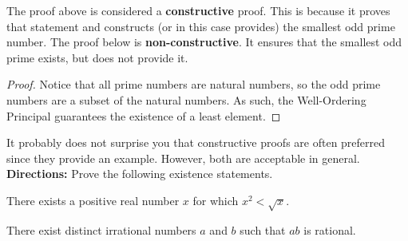 The proof above is considered a \textbf{constructive} proof.  This is because it proves that statement and constructs (or in this case provides) the smallest odd prime number.  The proof below is \textbf{non-constructive}.  It ensures that the smallest odd prime exists, but does not provide it.

\begin{proof}  Notice that all prime numbers are natural numbers, so the odd prime numbers are a subset of the natural numbers.  As such, the Well-Ordering Principal guarantees the existence of a least element.
\end{proof}
It probably does not surprise you that constructive proofs are often preferred since they provide an example.  However, both are acceptable in general.\\



\noindent \textbf{Directions:} Prove the following existence statements.
\newpage
\begin{claim}  There exists a positive real number $x$ for which $x^2 < \sqrt{x}$.
\end{claim}
\vspace{4in}

\begin{claim}  There exist distinct irrational numbers $a$ and $b$ such that $ab$ is rational.
\end{claim}






